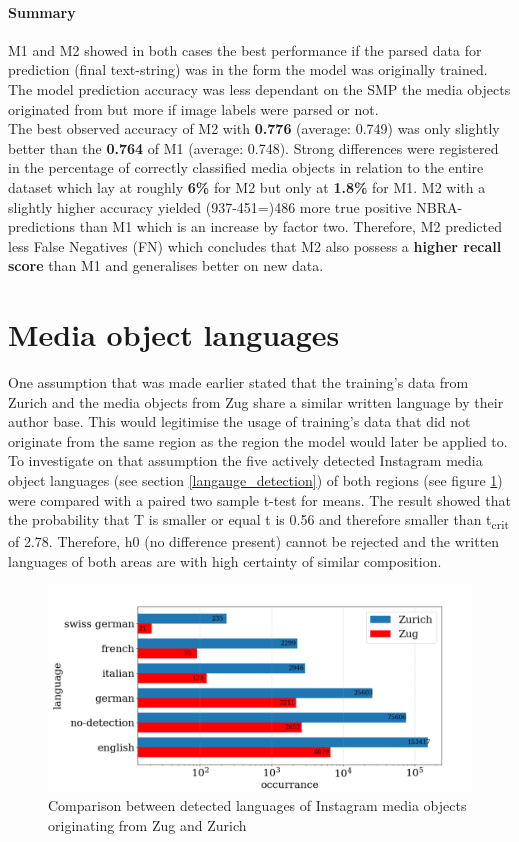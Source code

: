 \paragraph*{Summary}
M1 and M2 showed in both cases the best performance if the parsed data for prediction (final text-string) was in the form the model was originally trained.\\
The model prediction accuracy was less dependant on the SMP the media objects originated from but more if image labels were parsed or not.\\
The best observed accuracy of M2 with \textbf{0.776} (average: 0.749) was only slightly better than the \textbf{0.764} of M1 (average: 0.748). Strong differences were registered in the percentage of correctly classified media objects in relation to the entire dataset which lay at roughly \textbf{6\%} for M2 but only at \textbf{1.8\%} for M1.
M2 with a slightly higher accuracy yielded (937-451=)486 more true positive NBRA-predictions than M1 which is an increase by factor two. Therefore, M2 predicted less False Negatives (FN) which concludes that M2 also possess a \textbf{higher recall score} than M1 and generalises better on new data.

\section{Media object languages}
One assumption that was made earlier stated that the training's data from Zurich and the media objects from Zug share a similar written language by their author base. This would legitimise the usage of training's data that did not originate from the same region as the region the model would later be applied to.\\
To investigate on that assumption the five actively detected Instagram media object languages (see section \ref{langauge_detection}) of both regions (see figure \ref{fig:det_languages}) were compared with a paired two sample t-test for means. The result showed that the probability that T is smaller or equal t is 0.56 and therefore smaller than t\textsubscript{crit} of 2.78. Therefore, h0 (no difference present) cannot be rejected and the written languages of both areas are with high certainty of similar composition.

\begin{figure}[h!]
   \centering
   \includegraphics[width=\textwidth]{img/det_languages_bigger_font.pdf}
   \caption{Comparison between detected languages of Instagram media objects originating from Zug and Zurich}
   \label{fig:det_languages}
\end{figure}

